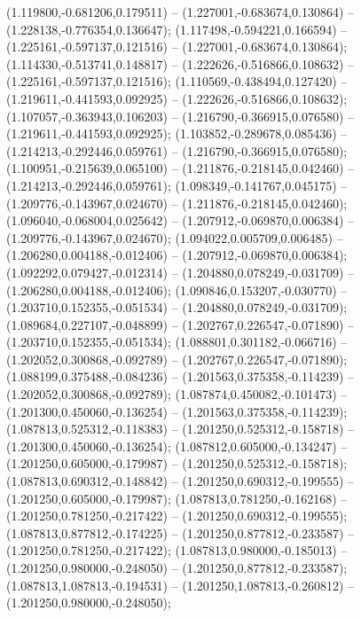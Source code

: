  (1.119800,-0.681206,0.179511) -- (1.227001,-0.683674,0.130864) -- (1.228138,-0.776354,0.136647);
 (1.117498,-0.594221,0.166594) -- (1.225161,-0.597137,0.121516) -- (1.227001,-0.683674,0.130864);
 (1.114330,-0.513741,0.148817) -- (1.222626,-0.516866,0.108632) -- (1.225161,-0.597137,0.121516);
 (1.110569,-0.438494,0.127420) -- (1.219611,-0.441593,0.092925) -- (1.222626,-0.516866,0.108632);
 (1.107057,-0.363943,0.106203) -- (1.216790,-0.366915,0.076580) -- (1.219611,-0.441593,0.092925);
 (1.103852,-0.289678,0.085436) -- (1.214213,-0.292446,0.059761) -- (1.216790,-0.366915,0.076580);
 (1.100951,-0.215639,0.065100) -- (1.211876,-0.218145,0.042460) -- (1.214213,-0.292446,0.059761);
 (1.098349,-0.141767,0.045175) -- (1.209776,-0.143967,0.024670) -- (1.211876,-0.218145,0.042460);
 (1.096040,-0.068004,0.025642) -- (1.207912,-0.069870,0.006384) -- (1.209776,-0.143967,0.024670);
 (1.094022,0.005709,0.006485) -- (1.206280,0.004188,-0.012406) -- (1.207912,-0.069870,0.006384);
 (1.092292,0.079427,-0.012314) -- (1.204880,0.078249,-0.031709) -- (1.206280,0.004188,-0.012406);
 (1.090846,0.153207,-0.030770) -- (1.203710,0.152355,-0.051534) -- (1.204880,0.078249,-0.031709);
 (1.089684,0.227107,-0.048899) -- (1.202767,0.226547,-0.071890) -- (1.203710,0.152355,-0.051534);
 (1.088801,0.301182,-0.066716) -- (1.202052,0.300868,-0.092789) -- (1.202767,0.226547,-0.071890);
 (1.088199,0.375488,-0.084236) -- (1.201563,0.375358,-0.114239) -- (1.202052,0.300868,-0.092789);
 (1.087874,0.450082,-0.101473) -- (1.201300,0.450060,-0.136254) -- (1.201563,0.375358,-0.114239);
 (1.087813,0.525312,-0.118383) -- (1.201250,0.525312,-0.158718) -- (1.201300,0.450060,-0.136254);
 (1.087812,0.605000,-0.134247) -- (1.201250,0.605000,-0.179987) -- (1.201250,0.525312,-0.158718);
 (1.087813,0.690312,-0.148842) -- (1.201250,0.690312,-0.199555) -- (1.201250,0.605000,-0.179987);
 (1.087813,0.781250,-0.162168) -- (1.201250,0.781250,-0.217422) -- (1.201250,0.690312,-0.199555);
 (1.087813,0.877812,-0.174225) -- (1.201250,0.877812,-0.233587) -- (1.201250,0.781250,-0.217422);
 (1.087813,0.980000,-0.185013) -- (1.201250,0.980000,-0.248050) -- (1.201250,0.877812,-0.233587);
 (1.087813,1.087813,-0.194531) -- (1.201250,1.087813,-0.260812) -- (1.201250,0.980000,-0.248050);
